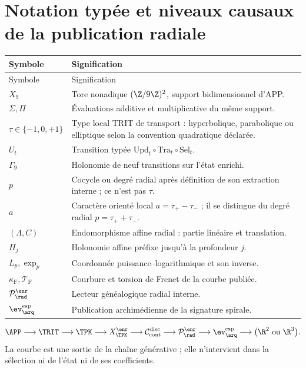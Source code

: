 \part{Notation typée et niveaux causaux de la publication radiale}
\begin{longtable}{>{\raggedright\arraybackslash}p{}p{}}
\toprule
Symbole & Signification\\
\midrule
\endfirsthead
\toprule
Symbole & Signification\\
\midrule
\endhead
\(X_9\) & Tore nonadique \((\Z/9\Z)^2\), support bidimensionnel d'APP.\\
\(\Sigma,\Pi\) & Évaluations additive et multiplicative du même support.\\
\(\tau\in\{-1,0,+1\}\) & Type local TRIT de transport : hyperbolique, parabolique ou elliptique selon la convention quadratique déclarée.\\
\(U_t\) & Transition typée \(\mathrm{Upd}_t\circ\mathrm{Tra}_t\circ\mathrm{Sel}_t\).\\
\(\Gamma_9\) & Holonomie de neuf transitions sur l'état enrichi.\\
\(p\) & Cocycle ou degré radial après définition de son extraction interne ; ce n'est pas \(\tau\).\\
\(a\) & Caractère orienté local \(a=\tau_+-\tau_-\) ; il se distingue du degré radial \(p=\tau_++\tau_-\).\\
\((\Lambda,C)\) & Endomorphisme affine radial : partie linéaire et translation.\\
\(H_j\) & Holonomie affine préfixe jusqu'à la profondeur \(j\).\\
\(L_p,\exp_p\) & Coordonnée puissance--logarithmique et son inverse.\\
\(\kappa_{\mathrm{F}},\mathcal T_{\mathrm{F}}\) & Courbure et torsion de Frenet de la courbe publiée.\\
\(\mathcal P^{\enr}_{\rad}\) & Lecteur généalogique radial interne.\\
\(\ev_{\arq}^{\mathrm{esp}}\) & Publication archimédienne de la signature spirale.\\
\bottomrule
\end{longtable}

\begin{resultbox}[title={Composition causale d'APP--TRIT--TPK à l'évaluation archimédienne radiale}]
\[
\APP\longrightarrow\TRIT\longrightarrow\TPK
\longrightarrow X_{\TPK}^{\enr}
\longrightarrow\mathcal C_{\mathrm{cont}}^{\mathrm{disc}}
\longrightarrow\mathcal P_{
  \rad}^{\enr}
\longrightarrow\ev_{\arq}^{\mathrm{esp}}
\longrightarrow\bigl(\R^2\ \text{ou}\ \R^3\bigr).
\]
La courbe est une sortie de la chaîne générative ; elle n'intervient dans la sélection ni de l'état ni de ses coefficients.
\end{resultbox}
